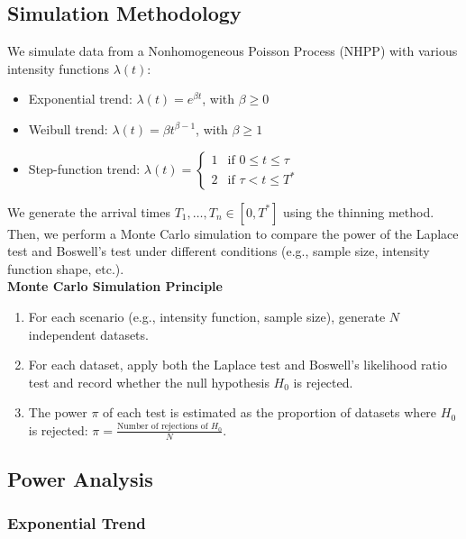 \documentclass{journalstyle}
\begin{document}
\subsection{Simulation Methodology}

We simulate data from a Nonhomogeneous Poisson Process (NHPP) with various intensity functions $\lambda(t)$:
\begin{itemize}
    \item Exponential trend: $\lambda(t) = e^{\beta t}$, with $\beta \geq 0$
    \item Weibull trend: $\lambda(t) = \beta t^{\beta - 1}$, with $\beta \geq 1$
    \item Step-function trend: $\lambda(t) = \begin{cases}
        1 & \text{if } 0 \leq t \leq \tau \\
        2 & \text{if } \tau < t \leq T^*
    \end{cases}$
\end{itemize}

We generate the arrival times $T_1, \ldots, T_n \in [0, T^*]$ using the thinning method.
Then, we perform a Monte Carlo simulation to compare the power of the Laplace test and Boswell's test under different conditions (e.g., sample size, intensity function shape, etc.). \\

\noindent\textbf{Monte Carlo Simulation Principle} \\
\begin{enumerate}
    \item For each scenario (e.g., intensity function, sample size), generate $N$ independent datasets.
    \item For each dataset, apply both the Laplace test and Boswell's likelihood ratio test and record whether the null hypothesis $H_0$ is rejected.
    \item The power $\pi$ of each test is estimated as the proportion of datasets where $H_0$ is rejected: $\pi = \frac{\text{Number of rejections of } H_0}{N}$.
\end{enumerate}




\subsection{Power Analysis}



\subsubsection{Exponential Trend}
\end{document}
